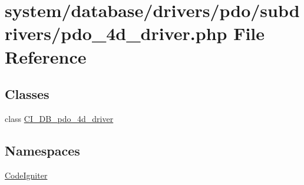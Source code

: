 \hypertarget{pdo__4d__driver_8php}{}\section{system/database/drivers/pdo/subdrivers/pdo\+\_\+4d\+\_\+driver.php File Reference}
\label{pdo__4d__driver_8php}
\subsection*{Classes}
\begin{DoxyCompactItemize}
\item 
class \mbox{\hyperlink{class_c_i___d_b__pdo__4d__driver}{C\+I\+\_\+\+D\+B\+\_\+pdo\+\_\+4d\+\_\+driver}}
\end{DoxyCompactItemize}
\subsection*{Namespaces}
\begin{DoxyCompactItemize}
\item 
 \mbox{\hyperlink{namespace_code_igniter}{Code\+Igniter}}
\end{DoxyCompactItemize}
